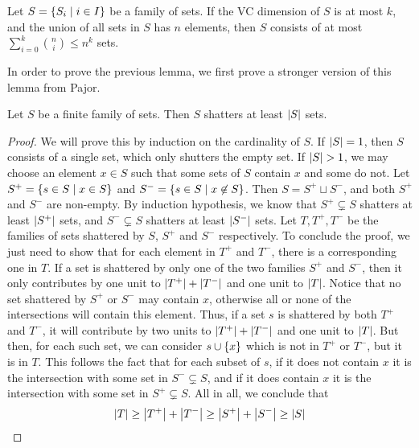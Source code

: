     \begin{lemma} \label{lem:sauer-shelah}
        Let $S = \left\{ S_i \mid i \in I \right\}$ be a family of sets.
        If the VC dimension of $S$ is at most $k$, and the union of all sets in $S$ has $n$ elements, then
        $S$ consists of at most $\sum_{i=0}^{k} \binom{n}{i} \leq n^k$ sets.
        \newline

        In order to prove the previous lemma, we first prove a stronger version of this lemma from Pajor.

        \label{lem:pajor}
            Let $S$ be a finite family of sets.
            Then $S$ shatters at least $\left| S \right|$ sets.
            \begin{proof}
                We will prove this by induction on the cardinality of $S$.
                If $\left| S \right| = 1$, then $S$ consists of a single set, which only shutters the empty set.
                If $\left| S \right| > 1$, we may choose an element $x \in S$ such that some sets of $S$ contain $x$ and some do not.
                Let $S^+ = \left\{ s \in S \mid x \in S \right\}$ and $S^- = \left\{ s \in S \mid x \not\in S \right\}$.
                Then $S = S^+ \sqcup S^-$, and both $S^+$ and $S^-$ are non-empty.
                By induction hypothesis, we know that $S^+ \subsetneq S$ shatters at least $\left| S^+ \right|$ sets,
                and $S^- \subsetneq S$ shatters at least $\left| S^- \right|$ sets.
                Let $T, T^+, T^-$ be the families of sets shattered by $S$, $S^+$ and $S^-$ respectively.
                To conclude the proof, we just need to show that for each element in $T^+$ and $T^-$, there is a corresponding
                one in $T$.
                If a set is shattered by only one of the two families $S^+$ and $S^-$, then it only contributes by one unit
                to $\left| T^+ \right| + \left| T^- \right|$ and one unit to $\left| T \right|$.
                Notice that no set shattered by $S^+$ or $S^-$ may contain $x$, otherwise all or none of the intersections
                will contain this element.
                Thus, if a set $s$ is shattered by both $T^+$ and $T^-$, it will contribute by two units to
                $\left| T^+ \right| + \left| T^- \right|$ and one unit to $\left| T \right|$.
                But then, for each such set, we can consider $s \cup \left\{ x \right\}$ which is not in $T^+$ or $T^-$, but it is in $T$.
                This follows the fact that for each subset of $s$, if it does not contain $x$ it is the intersection with some
                set in $S^- \subsetneq S$, and if it does contain $x$ it is the intersection with some set in $S^+ \subsetneq S$.
                All in all, we conclude that
                \[
                    \left| T \right| \geq \left| T^+ \right| + \left| T^- \right| \geq \left| S^+ \right| + \left| S^- \right|
                                    \geq \left| S \right|
                \]
            \end{proof}


\end{lemma}
